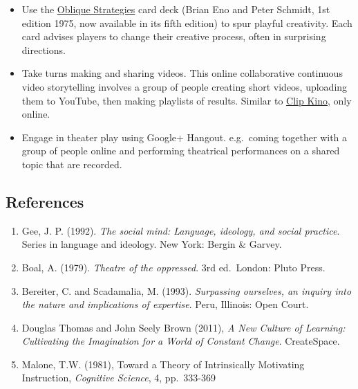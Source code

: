 \begin{itemize}
\tightlist
\item
  Use the \href{http://www.rtqe.net/ObliqueStrategies/}{Oblique
  Strategies} card deck (Brian Eno and Peter Schmidt, 1st edition 1975,
  now available in its fifth edition) to spur playful creativity. Each
  card advises players to change their creative process, often in
  surprising directions.
\item
  Take turns making and sharing videos. This online collaborative
  continuous video storytelling involves a group of people creating
  short videos, uploading them to YouTube, then making playlists of
  results. Similar to \href{http://clipkino.info/}{Clip Kino}, only
  online.
\item
  Engage in theater play using Google+ Hangout. e.g.~coming together
  with a group of people online and performing theatrical performances
  on a shared topic that are recorded.
\end{itemize}

\hypertarget{references}{%
\subsection{References}\label{references}}

\begin{enumerate}
\def\labelenumi{\arabic{enumi}.}
\item
  Gee, J. P. (1992). \emph{The social mind: Language, ideology, and
  social practice}. Series in language and ideology. New York: Bergin \&
  Garvey.
\item
  Boal, A. (1979). \emph{Theatre of the oppressed}. 3rd ed.~London:
  Pluto Press.
\item
  Bereiter, C. and Scadamalia, M. (1993). \emph{Surpassing ourselves, an
  inquiry into the nature and implications of expertise}. Peru,
  Illinois: Open Court.
\item
  Douglas Thomas and John Seely Brown (2011), \emph{A New Culture of
  Learning: Cultivating the Imagination for a World of Constant Change}.
  CreateSpace.
\item
  Malone, T.W. (1981), Toward a Theory of Intrinsically Motivating
  Instruction, \emph{Cognitive Science}, 4, pp.~333-369
\end{enumerate}
